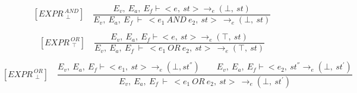    	\[
   	[EXPR^{\ AND}_{\ \ \bot}] \quad
   	\dfrac{E_v, \ E_a, \ E_f \vdash <e, \ st> \rightarrow_e (\bot, \ st) }{E_v, \ E_a, \ E_f \ \vdash \ <e_1 \ AND \ e_2, \ st> \ \rightarrow_e (\bot, \ st)}
   	\]
   	
   	
   	\[
   	[EXPR^{\ OR}_{\ \ \top}] \quad
   	\dfrac{E_v, \ E_a, \ E_f \vdash <e, \ st> \rightarrow_e (\top, \ st) }{E_v, \ E_a, \ E_f \ \vdash \ <e_1 \ OR \ e_2, \ st> \ \rightarrow_e (\top, \ st)}
   	\]
   	
   	\[
   	[EXPR^{\ OR}_{\ \ \bot}] \quad
   	\dfrac{E_v, \ E_a, \ E_f \vdash <e_1, \ st> \rightarrow_e (\bot, st^{''}) \qquad E_v, \ E_a, \ E_f \vdash <e_2, \ st^{''} \rightarrow_e (\bot, \ st^{'})}{E_v, \ E_a, \ E_f \ \vdash \ <e_1 \ OR \ e_2, \ st> \ \rightarrow_e (\bot, \ st^{'})}
   	\]  	
   	
   	